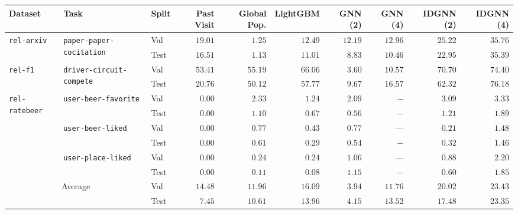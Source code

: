 \begin{tabular}{lllrrrrrrr}
\toprule
Dataset & Task & Split & Past Visit & Global Pop. & LightGBM & GNN (2) & GNN (4) & IDGNN (2) & IDGNN (4) \\
\midrule
\multirow[c]{2}{*}{\texttt{rel-arxiv}} & \multirow[c]{2}{*}{\texttt{paper-paper-cocitation}} & Val & $19.01$ & $1.25$ & $12.49$ & $12.19$ & $12.96$ & $25.22$ & $\bm{35.76}$ \\
 &  & Test & $16.51$ & $1.13$ & $11.01$ & $8.83$ & $10.46$ & $22.95$ & $\bm{35.39}$ \\
\cmidrule{1-10} \cmidrule{2-10}
\multirow[c]{2}{*}{\texttt{rel-f1}} & \multirow[c]{2}{*}{\texttt{driver-circuit-compete}} & Val & $53.41$ & $55.19$ & $66.06$ & $3.60$ & $10.57$ & $70.70$ & $\bm{74.40}$ \\
 &  & Test & $20.76$ & $50.12$ & $57.77$ & $9.67$ & $16.57$ & $62.32$ & $\bm{76.18}$ \\
\cmidrule{1-10} \cmidrule{2-10}
\multirow[c]{6}{*}{\texttt{rel-ratebeer}} & \multirow[c]{2}{*}{\texttt{user-beer-favorite}} & Val & $0.00$ & $2.33$ & $1.24$ & $2.09$ & $-$ & $3.09$ & $\bm{3.33}$ \\
 &  & Test & $0.00$ & $1.10$ & $0.67$ & $0.56$ & $-$ & $1.21$ & $\bm{1.89}$ \\
\cmidrule{2-10}
 & \multirow[c]{2}{*}{\texttt{user-beer-liked}} & Val & $0.00$ & $0.77$ & $0.43$ & $0.77$ & $—$ & $0.21$ & $\bm{1.48}$ \\
 &  & Test & $0.00$ & $0.61$ & $0.29$ & $0.54$ & $-$ & $0.32$ & $\bm{1.46}$ \\
\cmidrule{2-10}
 & \multirow[c]{2}{*}{\texttt{user-place-liked}} & Val & $0.00$ & $0.24$ & $0.24$ & $1.06$ & $—$ & $0.88$ & $\bm{2.20}$ \\
 &  & Test & $0.00$ & $0.11$ & $0.08$ & $1.15$ & $-$ & $0.60$ & $\bm{1.85}$ \\
\cmidrule{1-10} \cmidrule{2-10}
\multicolumn{2}{c}{\multirow{2}{*}{Average}} & Val & $14.48$ & $11.96$ & $16.09$ & $3.94$ & $11.76$ & $20.02$ & $\bm{23.43}$ \\
 &  & Test & $7.45$ & $10.61$ & $13.96$ & $4.15$ & $13.52$ & $17.48$ & $\bm{23.35}$ \\
\bottomrule
\end{tabular}
